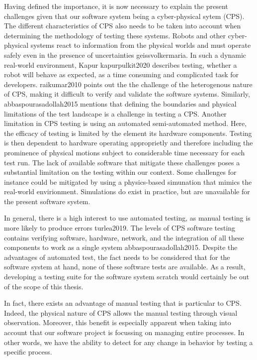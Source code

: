 


Having defined the importance, it is now necessary to explain the present challenges given that our software system being a cyber-physical sytem (CPS). The different characteristics of CPS also needs to be taken into account when determining the methodology of testing these systems. Robots and other cyber-physical systems react to information from the physical worlds and must operate safely even in the presence of uncertainties {geissvolkermaria}. In such a dynamic real-world environment, Kapur {kapurpulkit2020} describes testing, whether a robot will behave as expected, as a time consuming and complicated task for developers. {raikumar2010} points out the the challenge of the heterogenous nature of CPS, making it difficult to verify and validate the software systems. Similarly, {abbaspourasadollah2015} mentions that defining the boundaries and physical limitations of the test landscape is a challenge in testing a CPS. Another limitation in CPS testing is using an automated semi-automated method. Here, the efficacy of testing is limited by the element its hardware components. Testing is then dependent to hardware operating approprietly and therefore including the prominence of physical motions subject to considerable time necessary for each test run. The lack of available software that mitigate these challenges poses a substantial limitation on the testing within our context. Some challenges for instance could be mitigated by using a physics-based simunation that mimics the real-world envirionment. Simulations do exist in practice, but are unavailable for the present software system. 


In general, there is a high interest to use automated testing, as manual testing is more likely to produce errors {turlea2019}.  The levels of CPS software testing contains verifying software, hardware, network, and the integration of all these components to work as a single system {abbaspourasadollah2015}. Despite the advantages of automated test, the fact needs to be considered that for the software system at hand, none of these software tests are available. As a result, developing a testing suite for the software system scratch would certainly be out of the scope of this thesis. 

In fact, there exists an advantage of manual testing that is particular to CPS. Indeed, the physical nature of CPS allows the manual testing through visual observation. Moreover, this benefit is especially apparent when taking into account that our software project is focussing on managing entire processes. In other words, we have the ability to detect for any change in behavior by testing a specific process. 

